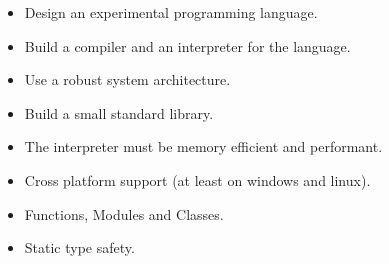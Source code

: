 \begin{slide}
    \begin{itemize}
        \item Design an experimental programming language.
        \item Build a compiler and an interpreter for the language.
        \item Use a robust system architecture.
        \item Build a small standard library.
    \end{itemize}
\end{slide}
\begin{slide}
    \begin{itemize}
        \item The interpreter must be memory efficient and performant.
        \item Cross platform support (at least on windows and linux).
        \item Functions, Modules and Classes.
        \item Static type safety.
    \end{itemize}
\end{slide}

